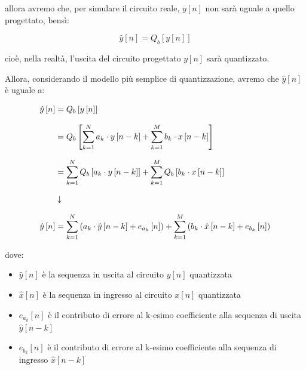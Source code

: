 allora avremo che, per simulare il circuito reale, $y \left[ n\right]$ non sarà uguale a quello progettato, bensì: 

{
    \Large 
    \begin{equation}
        \hat{y} \left[ n\right] 
        = 
        Q_{b} \left[ y \left[ n\right]\right]
    \end{equation}
}

cioè, nella realtà, l'uscita del circuito progettato $y \left[ n\right]$ sarà quantizzato. \newline 

Allora, considerando il modello più semplice di quantizzazione, avremo che $\hat{y} \left[ n\right]$ è uguale a: 

{
    \Large 
    \begin{equation}
         \setlength{\jot}{10pt} %
    \begin{split}
        \hat{y} \left[ n\right] 
        &= 
        Q_{b} \left[ y \left[ n\right]\right] 
        \\
        &= 
        Q_b 
        \left[ 
        \sum_{k = 1}^{N} 
        a_k \cdot y \left[ n - k\right] 
        + 
        \sum_{k = 1}^{M} 
        b_k \cdot x \left[ n - k\right] 
        \right] 
        \\
        &= 
        \sum_{k = 1}^{N} 
        Q_b 
        \left[ 
        a_k \cdot y \left[ n - k\right] 
        \right]
        + 
        \sum_{k = 1}^{M} 
        Q_b 
        \left[ 
        b_k \cdot x \left[ n - k\right]
        \right] 
        \\
        &\downarrow
        \\
        \hat{y} \left[ n\right] 
        &= 
        \sum_{k = 1}^{N} 
        \left( 
        a_k \cdot \hat{y} \left[ n - k\right] 
        + 
        e_{a_k} \left[ n\right]
        \right)
        + 
        \sum_{k = 1}^{M} 
        \left( 
        b_k \cdot \hat{x} \left[ n - k\right]
        + 
        e_{b_k} \left[ n\right]
        \right) 
    \end{split}
    \end{equation}
} 

dove: 

\begin{itemize}
    \item $\hat{y} \left[ n\right]$ è la sequenza in uscita al circuito $y \left[ n\right]$ quantizzata 
    \item $\hat{x} \left[ n\right]$ è la sequenza in ingresso al circuito $x \left[ n\right]$ quantizzata 
    \item $e_{a_k} \left[ n\right]$ è il contributo di errore al k-esimo coefficiente alla sequenza di uscita $\hat{y} \left[ n - k\right]$
    \item $e_{b_k} \left[ n\right]$ è il contributo di errore al k-esimo coefficiente alla sequenza di ingresso $\hat{x} \left[ n - k\right]$
\end{itemize}

